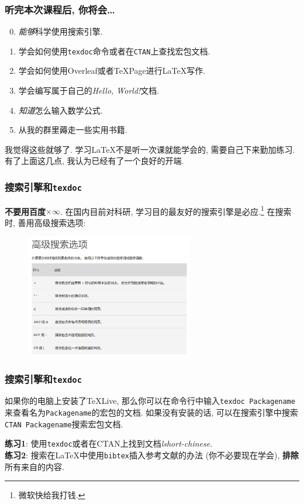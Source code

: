 \documentclass{beamer}
\begin{document}
\begin{frame}
    \frametitle{听完本次课程后, 你将会\dots}
    \begin{enumerate}[(1)]
        \setcounter{enumi}{-1}
        \item \emph{能够}科学使用搜索引擎.
        \item 学会如何使用\Verb|texdoc|命令或者在\Verb|CTAN|上查找宏包文档.
        \item 学会如何使用Overleaf或者\TeX{}Page进行\LaTeX{}写作.
        \item 学会编写属于自己的\emph{Hello, World!}文档.
        \item \emph{知道}怎么输入数学公式.
        \item 从我的群里薅走一些实用书籍.
    \end{enumerate}\pause
    我觉得这些就够了.
    学习\LaTeX{}不是听一次课就能学会的, 需要自己下来勤加练习.
    有了上面这几点, 我认为已经有了一个良好的开端.
\end{frame}

\begin{frame}
    \frametitle{搜索引擎和\Verb|texdoc|}
    \textbf{不要用百度}$\times\infty$.
    在国内目前对科研, 学习目的最友好的搜索引擎是必应.\footnote{微软快给我打钱.}
    在搜索时, 善用高级搜索选项:
    \begin{figure}[h]
        \centering
        \includegraphics[width=0.65\textwidth]{figure/bing-search.png}
    \end{figure}
\end{frame}

\begin{frame}[fragile]
    \frametitle{搜索引擎和\Verb|texdoc|}
    如果你的电脑上安装了\TeX{}Live, 那么你可以在命令行中输入\Verb|texdoc Packagename|来查看名为\Verb|Packagename|的宏包的文档.
    如果没有安装的话, 可以在搜索引擎中搜索\Verb|CTAN Packagename|搜索宏包文档.\pause

    \textbf{练习1}: 使用\Verb|texdoc|或者在CTAN上找到文档\emph{lshort-chinese}.\\
    \textbf{练习2}: 搜索在\LaTeX{}中使用\Verb|bibtex|插入参考文献的办法 (你不必要现在学会), \textbf{排除}所有来自的内容.
\end{frame}
\end{document}
